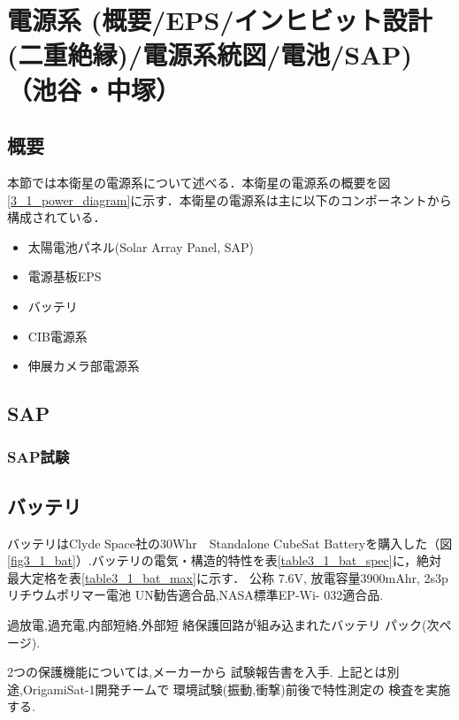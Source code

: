 \section{電源系 (概要/EPS/インヒビット設計(二重絶縁)/電源系統図/電池/SAP)（池谷・中塚）}
\subsection{概要}
本節では本衛星の電源系について述べる．本衛星の電源系の概要を図\ref{3_1_power_diagram}に示す．本衛星の電源系は主に以下のコンポーネントから構成されている．
\begin{itemize}
	\item 太陽電池パネル(Solar Array Panel, SAP)
	\item 電源基板EPS
	\item バッテリ
	\item CIB電源系
	\item 伸展カメラ部電源系
\end{itemize}




\subsection{SAP}

\subsubsection{SAP試験}

\subsection{バッテリ}
バッテリはClyde Space社の30Whr　Standalone CubeSat Batteryを購入した（図\ref{fig3_1_bat}）.バッテリの電気・構造的特性を表\ref{table3_1_bat_spec}に，絶対最大定格を表\ref{table3_1_bat_max}に示す．
公称 7.6V, 放電容量3900mAhr,
2s3p リチウムポリマー電池
UN勧告適合品,NASA標準EP-Wi-
032適合品.

過放電,過充電,内部短絡,外部短
絡保護回路が組み込まれたバッテリ
パック(次ページ).

2つの保護機能については,メーカーから
試験報告書を入手.
上記とは別途,OrigamiSat-1開発チームで
環境試験(振動,衝撃)前後で特性測定の
検査を実施する.

